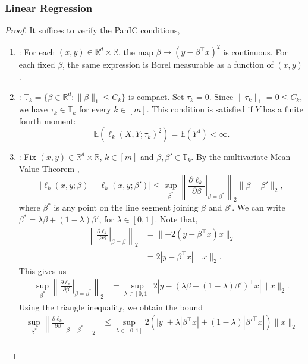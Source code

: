 \documentclass[12pt]{article}
\newcommand{\blue}[1]{\textcolor[rgb]{0.00,0.00,1.00}{#1}}
\theoremstyle{remark}
\theoremstyle{plain}
\begin{document}
\subsubsection{Linear Regression}
\begin{proof}
    It suffices to verify the PanIC conditions,
    \begin{enumerate}
    \item[A1]: For each $(x,y)\in\mathbb R^d\times\mathbb R$, the map
    $\beta\mapsto(y-\beta^\top x)^2$ is continuous. For each fixed $\beta$, the same expression is Borel measurable as a function of $(x,y)$.
    \item[A2]: $\mathbb{T}_k = \{\beta\in \mathbb{R}^d: \lVert\beta\rVert_1 \leq C_k\}$ is compact. Set $\tau_k=0$. Since $\lVert\tau_k\rVert_1=0\leq C_k$, we have $\tau_k\in\mathbb{T}_k$ for every $k\in[m]$. This condition is satisfied if $Y$ has a finite fourth moment:
    \[\mathbb{E}\left(\ell_k(X, Y; \tau_k)^2\right) = \mathbb{E}\left(Y^4\right) < \infty.\]
    \item[A3]: Fix \blue{$(x,y)\in \mathbb R^d\times\mathbb R$}, $k \in \left[m\right]$ and $\beta, \beta' \in \mathbb{T}_k$. By the multivariate Mean Value Theorem \citep{davidson_stochastic_2021},
    \[|\ell_k(x, y; \beta) - \ell_k(x, y; \beta')| \leq \sup_{\beta^*} \left\lVert \left. \frac{\partial \ell_k}{\partial \beta}\right|_{\beta = \beta^*} \right \rVert_2 \lVert \beta - \beta'\rVert_2, \]
    where $\beta^*$ is any point on the line segment joining $\beta$ and $\beta'$. We can write $\beta^* = \lambda\beta + (1 - \lambda)\beta'$, for $\lambda\in\left[0, 1\right]$. Note that,
    \begin{align*}
        \left\lVert \left. \frac{\partial \ell_k}{\partial \beta}\right|_{\beta = \beta} \right \rVert_2 &= \lVert-2(y - \beta^\top x)x\rVert_2\\
        &= 2 \left\lvert y -  \beta^\top x\right\rvert\lVert x\rVert_2.
    \end{align*}
    This gives us
    \begin{align*}
        \sup_{\beta^*} \left\lVert \left. \frac{\partial \ell_k}{\partial \beta}\right|_{\beta = \beta^*} \right \rVert_2 &= \sup_{\lambda \in \left[0,1\right]} 2 \left\lvert y - (\lambda \beta  + (1 - \lambda)\beta')^\top x \right\rvert\lVert x\rVert_2.
    \end{align*}
    Using the triangle inequality, we obtain the bound
        \begin{align*}
        \sup_{\beta^*} \left\lVert \left. \frac{\partial \ell_k}{\partial \beta}\right|_{\beta = \beta^*} \right \rVert_2 &\leq \sup_{\lambda \in \left[0,1\right]} 2 \left(|y| + \lambda \left|\beta^\top x\right| + (1 - \lambda) \left|\beta'^\top x\right|\right)\lVert x\rVert_2\\

\end{align*}
\end{enumerate}
\end{proof}
\end{document}
